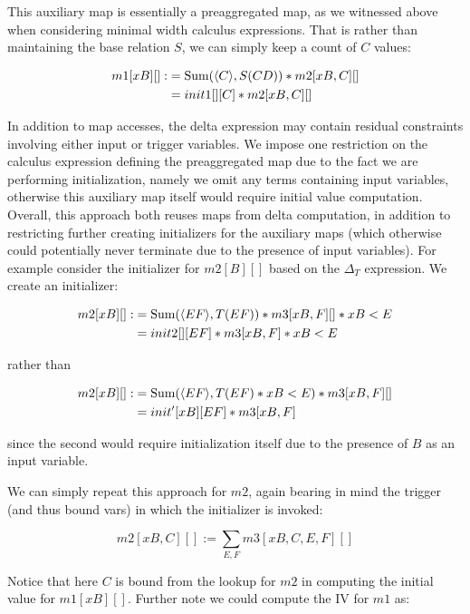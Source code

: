 \begin{itemize}
  This auxiliary map is essentially a preaggregated map, as we witnessed above
  when considering minimal width calculus expressions. That is rather than
  maintaining the base relation $S$, we can simply keep a count of $C$ values:
  
  \begin{align*}
  m1[xB][] :&= \mbox{Sum}({\langle C\rangle}, S(CD)) * m2[xB,C][]\\
  & = init1[][C] * m2[xB,C][]
  \end{align*}

  In addition to map accesses, the delta expression may contain residual
  constraints involving either input or trigger variables. We impose one
  restriction on the calculus expression defining the preaggregated map due to
  the fact we are performing initialization, namely we omit any terms containing
  input variables, otherwise this auxiliary map itself would require initial
  value computation. Overall, this approach both reuses maps from delta
  computation, in addition to restricting further creating initializers for the
  auxiliary maps (which otherwise could potentially never terminate due to the
  presence of input variables). For example consider the initializer for
  $m2[B][]$ based on the $\Delta_T$ expression. We create an initializer:
  
  \begin{align*}
  m2[xB][] :&= \mbox{Sum}({\langle EF\rangle}, T(EF)) * m3[xB,F][] * xB < E\\
  & = init2[][EF] * m3[xB,F] * xB < E 
  \end{align*}
  
  rather than
  
  \begin{align*}
  m2[xB][] :&= \mbox{Sum}({\langle EF\rangle}, T(EF) * xB<E) * m3[xB,F][]\\
  & = init'[xB][EF] * m3[xB,F]
  \end{align*}
  
  since the second would require initialization itself due to the presence of
  $B$ as an input variable.
  
  We can simply repeat this approach for $m2$, again bearing in mind the trigger
  (and thus bound vars) in which the initializer is invoked:
  
  \[m2[xB,C][] := \sum_{E,F} m3[xB,C,E,F][]\]
  
  
  Notice that here $C$ is bound from the lookup for $m2$ in computing the
  initial value for $m1[xB][]$. Further note we could compute the IV for $m1$
  as:
  

\end{itemize}
